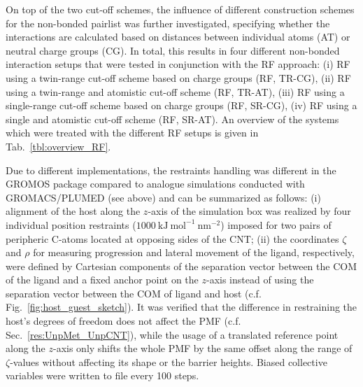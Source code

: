 \documentclass[9pt,lessons]{livecoms}
\begin{document}
On top of the two cut-off schemes, the influence of different construction schemes for the non-bonded pairlist was further investigated, 
specifying whether the interactions are calculated based on distances between individual atoms (AT) or neutral charge groups (CG).
In total, this results in four different non-bonded interaction setups that were tested in conjunction with the RF approach:
(i) RF using a twin-range cut-off scheme based on charge groups (RF, TR-CG),
(ii) RF using a twin-range and atomistic cut-off scheme (RF, TR-AT),
(iii) RF using a single-range cut-off scheme based on charge groups (RF, SR-CG),
(iv) RF using a single and atomistic cut-off scheme (RF, SR-AT).
An overview of the systems which were treated with the different RF setups is given in Tab.~\ref{tbl:overview_RF}.

Due to different implementations, the restraints handling was different in the GROMOS package compared to analogue simulations conducted with GROMACS/PLUMED (see above) and can be summarized as follows:
(i) alignment of the host along the $z$-axis of the simulation box was realized by four individual position restraints ($1000~\mathrm{kJ~mol}^{-1}~\mathrm{nm}^{-2}$) imposed for two pairs of peripheric C-atoms 
located at opposing sides of the CNT;
(ii) the coordinates $\zeta$ and $\rho$  for measuring progression and lateral movement of the ligand, respectively, were defined by Cartesian components of the separation vector between the COM of the ligand and a fixed anchor point on the $z$-axis instead of using the separation vector between the COM of ligand and host (c.f. Fig.~\ref{fig:host_guest_sketch}).
It was verified that the difference in restraining the host's degrees of freedom does not affect the PMF (c.f. Sec.~\ref{res:UnpMet_UnpCNT}), 
while the usage of a translated reference point along the $z$-axis only shifts the whole PMF by the same offset along the range of $\zeta$-values without affecting its shape or the barrier heights. 
Biased collective variables were written to file every 100 steps.
\end{document}
